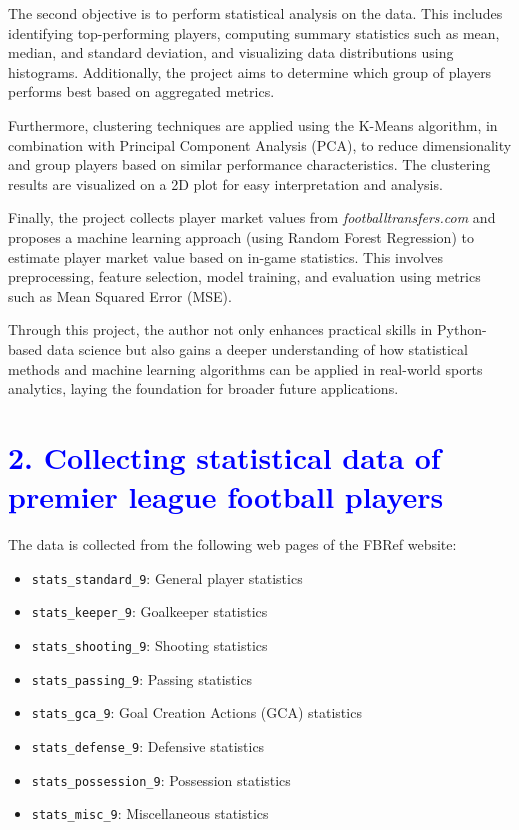 \documentclass[a4paper,12pt]{article}
\begin{document}
The second objective is to perform statistical analysis on the data. This includes identifying top-performing players, computing summary statistics such as mean, median, and standard deviation, and visualizing data distributions using histograms. Additionally, the project aims to determine which group of players performs best based on aggregated metrics.

Furthermore, clustering techniques are applied using the K-Means algorithm, in combination with Principal Component Analysis (PCA), to reduce dimensionality and group players based on similar performance characteristics. The clustering results are visualized on a 2D plot for easy interpretation and analysis.

Finally, the project collects player market values from \textit{footballtransfers.com} and proposes a machine learning approach (using Random Forest Regression) to estimate player market value based on in-game statistics. This involves preprocessing, feature selection, model training, and evaluation using metrics such as Mean Squared Error (MSE).

Through this project, the author not only enhances practical skills in Python-based data science but also gains a deeper understanding of how statistical methods and machine learning algorithms can be applied in real-world sports analytics, laying the foundation for broader future applications.

\newpage
\section*{\textcolor{blue}{\Large 2. Collecting statistical data of premier league football players}}
The data is collected from the following web pages of the FBRef website:
\begin{itemize}
    \item \texttt{stats\_standard\_9}: General player statistics
    \item \texttt{stats\_keeper\_9}: Goalkeeper statistics
    \item \texttt{stats\_shooting\_9}: Shooting statistics
    \item \texttt{stats\_passing\_9}: Passing statistics
    \item \texttt{stats\_gca\_9}: Goal Creation Actions (GCA) statistics
    \item \texttt{stats\_defense\_9}: Defensive statistics
    \item \texttt{stats\_possession\_9}: Possession statistics
    \item \texttt{stats\_misc\_9}: Miscellaneous statistics
\end{itemize}
\end{document}
